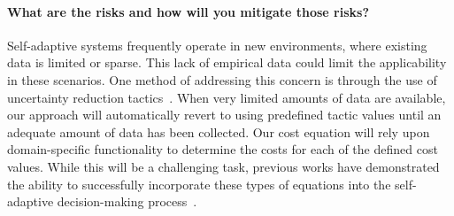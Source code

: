 \documentclass[12pt]{article}
\begin{document}



\vspace{-5mm}\paragraph{What are the risks and how will you mitigate those risks? }Self-adaptive systems frequently operate in new environments, where existing data is limited or sparse. This lack of empirical data could limit the applicability in these scenarios. One method of addressing this concern is through the use of uncertainty reduction tactics~\cite{moreno2018uncertainty}. When very limited amounts of data are available, our approach will automatically revert to using predefined tactic values until an adequate amount of data has been collected. Our cost equation will rely upon domain-specific functionality to determine the costs for each of the defined cost values. While this will be a challenging task, previous works have demonstrated the ability to successfully incorporate these types of equations into the self-adaptive decision-making process~\cite{Donckt-Cost}.








\end{document}
